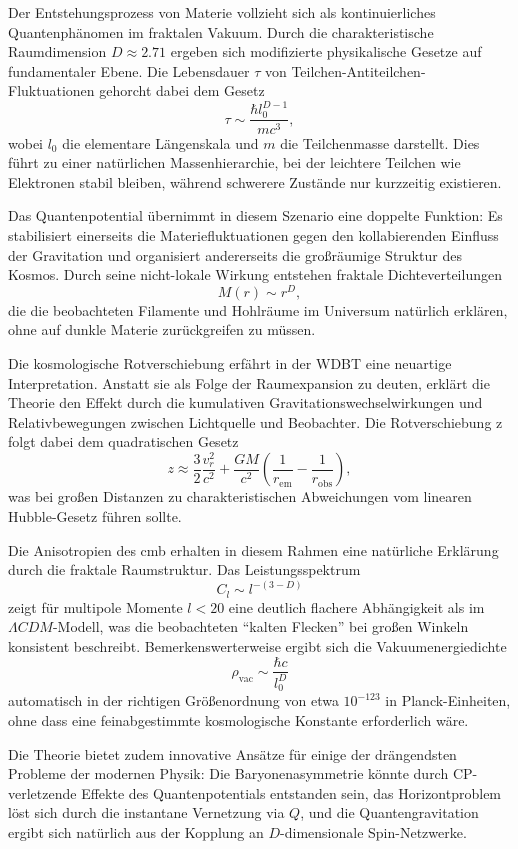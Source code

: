 Der Entstehungsprozess von Materie vollzieht sich als kontinuierliches Quantenphänomen im fraktalen Vakuum. Durch die charakteristische Raumdimension $D \approx 2.71$ ergeben sich modifizierte
physikalische Gesetze auf fundamentaler Ebene. Die Lebensdauer $\tau$ von Teilchen-Antiteilchen-Fluktuationen gehorcht dabei dem Gesetz
\begin{equation}
    \tau \sim \frac{\hbar l_0^{D-1}}{mc^3},
\end{equation}
wobei $l_0$ die elementare Längenskala und $m$ die Teilchenmasse darstellt. Dies führt zu einer natürlichen Massenhierarchie, bei der leichtere Teilchen wie Elektronen stabil bleiben, während schwerere
Zustände nur kurzzeitig existieren.

Das Quantenpotential übernimmt in diesem Szenario eine doppelte Funktion: Es stabilisiert einerseits die Materiefluktuationen gegen den kollabierenden Einfluss der Gravitation und organisiert
andererseits die großräumige Struktur des Kosmos. Durch seine nicht-lokale Wirkung entstehen fraktale Dichteverteilungen
\begin{equation}
    M(r) \sim r^D,
\end{equation}
die die beobachteten Filamente und Hohlräume im Universum natürlich erklären, ohne auf dunkle Materie zurückgreifen zu müssen.

Die kosmologische Rotverschiebung erfährt in der WDBT eine neuartige Interpretation. Anstatt sie als Folge der Raumexpansion zu deuten, erklärt die Theorie den Effekt durch die kumulativen
Gravitationswechselwirkungen und Relativbewegungen zwischen Lichtquelle und Beobachter. Die Rotverschiebung z folgt dabei dem quadratischen Gesetz
\begin{equation}
    z \approx \frac{3}{2}\frac{v_r^2}{c^2} + \frac{GM}{c^2}\left(\frac{1}{r_{\text{em}}} - \frac{1}{r_{\text{obs}}}\right),
\end{equation}
was bei großen Distanzen zu charakteristischen Abweichungen vom linearen Hubble-Gesetz führen sollte.

Die Anisotropien des \gls{cmb} erhalten in diesem Rahmen eine natürliche Erklärung durch die fraktale Raumstruktur. Das Leistungsspektrum
\begin{equation}
    C_l \sim l^{-(3-D)}
\end{equation}
zeigt für multipole Momente $l < 20$ eine deutlich flachere Abhängigkeit als im $\varLambda CDM$-Modell, was die beobachteten \enquote{kalten Flecken} bei großen Winkeln konsistent beschreibt.
Bemerkenswerterweise ergibt sich die Vakuumenergiedichte
\begin{equation}
    \rho_{\text{vac}} \sim \frac{\hbar c}{l_0^D}
\end{equation}
automatisch in der richtigen Größenordnung von etwa $10^{-123}$ in Planck-Einheiten, ohne dass eine feinabgestimmte kosmologische Konstante erforderlich wäre.

Die Theorie bietet zudem innovative Ansätze für einige der drängendsten Probleme der modernen Physik: Die Baryonenasymmetrie könnte durch CP-verletzende Effekte des Quantenpotentials
entstanden sein, das Horizontproblem löst sich durch die instantane Vernetzung via $Q$, und die Quantengravitation ergibt sich natürlich aus der Kopplung an $D$-dimensionale Spin-Netzwerke.
